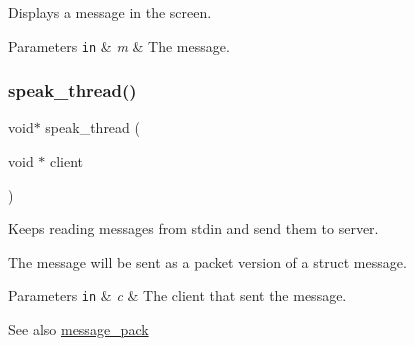 Displays a message in the screen. 


\begin{DoxyParams}[1]{Parameters}
\mbox{\tt in}  & {\em m} & The message. \\
\hline
\end{DoxyParams}
\mbox{\label{zip-zop-client_8c_a7ca038c133aa6aca1c539e69d4ee675f}} 
\subsubsection{\texorpdfstring{speak\+\_\+thread()}{speak\_thread()}}
{\footnotesize\ttfamily void$\ast$ speak\+\_\+thread (\begin{DoxyParamCaption}\item[{void $\ast$}]{client }\end{DoxyParamCaption})}



Keeps reading messages from {\ttfamily stdin} and send them to server. 

The message will be sent as a packet version of a struct message.


\begin{DoxyParams}[1]{Parameters}
\mbox{\tt in}  & {\em c} & The client that sent the message.\\
\hline
\end{DoxyParams}
\begin{DoxySeeAlso}{See also}
\hyperlink{message_8h_a0e07715664284f7a821216ca83317e60}{message\+\_\+pack} 
\end{DoxySeeAlso}
